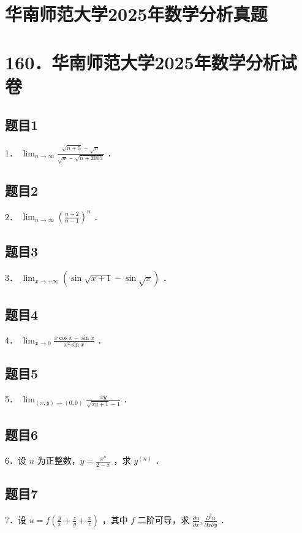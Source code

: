 \documentclass{article}
\begin{document}
\section*{华南师范大学2025年数学分析真题}
\section*{160．华南师范大学2025年数学分析试卷}

\subsection{题目1}
1． \(\lim _{n \rightarrow \infty} \frac{\sqrt{n+5}-\sqrt{n}}{\sqrt{n}-\sqrt{n+2005}}\) ．

\subsection{题目2}
2． \(\lim _{n \rightarrow \infty}\left(\frac{n+2}{n-1}\right)^{n}\) ．

\subsection{题目3}
3． \(\lim _{x \rightarrow+\infty}(\sin \sqrt{x+1}-\sin \sqrt{x})\) ．

\subsection{题目4}
4． \(\lim _{x \rightarrow 0} \frac{x \cos x-\sin x}{x^{2} \sin x}\) ．

\subsection{题目5}
5． \(\lim _{(x, y) \rightarrow(0,0)} \frac{x y}{\sqrt{x y+1}-1}\) ．

\subsection{题目6}
6．设 \(n\) 为正整数，\(y=\frac{x^{n}}{2-x}\) ，求 \(y^{(n)}\) ．

\subsection{题目7}
7．设 \(u=f\left(\frac{y}{x}+\frac{z}{y}+\frac{x}{z}\right)\) ，其中 \(f\) 二阶可导，求 \(\frac{\partial u}{\partial x}, \frac{\partial^{2} u}{\partial x \partial y}\) ．
\end{document}
